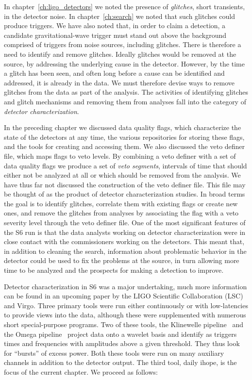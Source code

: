 In chapter~\ref{ch:ligo_detectors} we noted the presence of
\emph{glitches}, short transients, in the detector noise.  In
chapter~\ref{ch:search} we noted that such glitches could produce
triggers.  We have also noted that, in order to claim a detection, a
candidate gravitational-wave trigger must stand out above the
background comprised of triggers from noise sources, including
glitches.  There is therefore a need to identify and remove glitches.
Ideally glitches would be removed at the source, by addressing the
underlying cause in the detector.  However, by the time a glitch has
been seen, and often long before a cause can be identified and
addressed, it is already in the data.  We must therefore devise ways
to remove glitches from the data as part of the analysis.  The
activities of identifying glitches and glitch mechanisms and removing
them from analyses fall into the category of \emph{detector
characterization}.

In the preceding chapter we discussed data quality flags, which
characterize the state of the detectors at any time, the various
repositories for storing these flags, and the tools for creating and
accessing them.  We also discussed the veto definer file, which maps
flags to veto levels.  By combining a veto definer with a set of data
quality flags we produce a set of \emph{veto segments}, intervals of
time that should either not be analyzed at all or which should be
removed from the analysis.  We have thus far not discussed the
construction of the veto definer file.  This file may be thought of as
the product of detector characterization studies.  In broad terms the
goal is to identify glitches, correlate them with existing flags or
create new ones, and remove the glitches from analyses by associating
the flag with a veto severity level through the veto definer file.
One of the most significant features of the S6 run is that the data
analysts working on detector characterization were in close contact
with the commissioners working on the detectors.  This meant that, in
addition to cleaning the search, information about problematic
behavior in the detector could be used to fix the problems at the
source, in turn allowing more time to be analyzed and the prospects
for making a detection to improve.

Detector characterization in S6 was a major undertaking, much more
information can be found in an upcoming paper by the LIGO Scientific
Collaboration (LSC) and Virgo.  Three primary tools were run either
continuously or with low-latencies to provide views into the data,
although these were supplemented with numerous short special-purpose
programs.  Two of these tools, the Klinewelle
pipeline~\cite{LIGO-T060221-00-Z} and the Omega
pipeline~\cite{Chatterji:thesis} project data onto a wavelet basis and
identify as triggers times and frequencies with amplitudes above a
given threshold.  They thus look for ``bursts'' of excess power.  Both
these tools were run on many auxiliary channels in addition to the
detector output.  The third tool, daily ihope, is the focus of the
current chapter.  We proceed as follows:  

